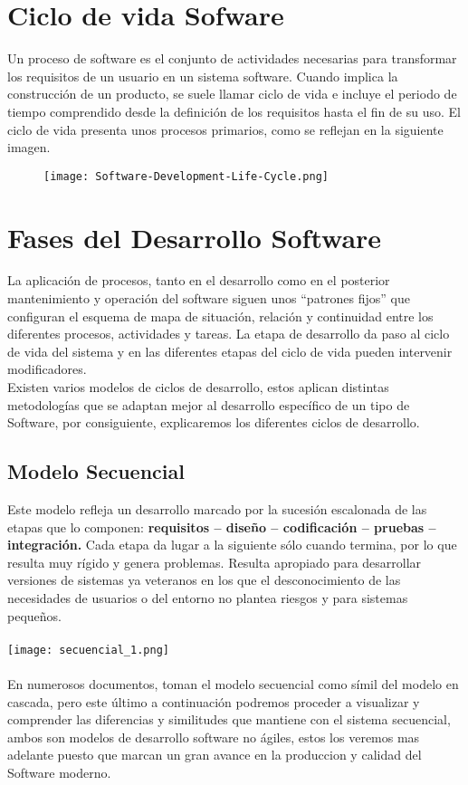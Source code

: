 \documentclass{article}
\begin{document}
\section{Ciclo de vida Sofware}
Un proceso de software es el conjunto de actividades necesarias para transformar los requisitos de un usuario en un sistema software. 
Cuando implica la construcción de un producto, se suele llamar ciclo de vida e incluye el periodo de tiempo comprendido desde la definición 
de los requisitos hasta el fin de su uso. El ciclo de vida presenta unos procesos primarios, como se reflejan en la siguiente imagen.
\\

\begin{figure}[b]
   
    \texttt{[image: Software-Development-Life-Cycle.png]}
    \centering
    
\end{figure}

\newpage
\section{Fases del Desarrollo Software}
La aplicación de procesos, tanto en el desarrollo como en el posterior mantenimiento y operación del software siguen unos “patrones fijos” 
que configuran el esquema de mapa de situación, relación y continuidad entre los diferentes procesos, actividades y tareas. La etapa de 
desarrollo da paso al ciclo de vida del sistema y en las diferentes etapas del ciclo de vida pueden intervenir modificadores.
\\
Existen varios modelos de ciclos de desarrollo, estos aplican distintas metodologías que se adaptan mejor al desarrollo específico de un tipo 
de Software, por consiguiente, explicaremos los diferentes ciclos de desarrollo.
\\
\subsection{Modelo Secuencial}
Este modelo refleja un desarrollo marcado por la sucesión escalonada de las etapas que lo componen: \textbf{requisitos – diseño – codificación – pruebas – integración.}
Cada etapa da lugar a la siguiente sólo cuando termina, por lo que resulta muy rígido y genera problemas. Resulta apropiado para desarrollar versiones de sistemas 
ya veteranos en los que el desconocimiento de las necesidades de usuarios o del entorno no plantea riesgos y para sistemas pequeños.
\\
\\
\texttt{[image: secuencial\_1.png]}
\\
\\
En numerosos documentos, toman el modelo secuencial como símil del modelo en cascada, pero este último a continuación podremos proceder a visualizar y comprender
las diferencias y similitudes que mantiene con el sistema secuencial, ambos son modelos de desarrollo software no ágiles, estos los veremos mas adelante puesto que 
marcan un gran avance en la produccion y calidad del Software moderno.
\end{document}
